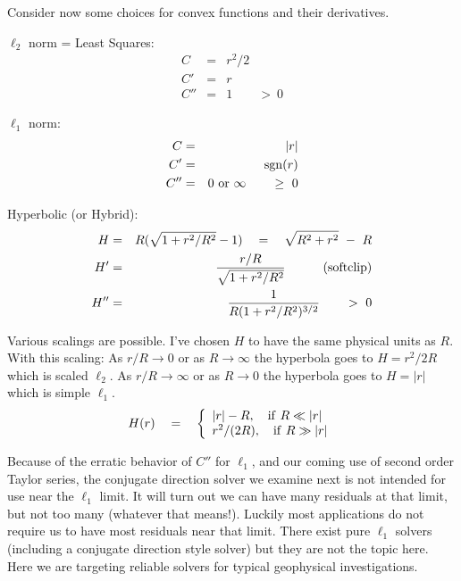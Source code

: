 Consider now some choices for convex functions
and their derivatives.
\noindent\par $\ell_2$ norm = Least Squares:
\begin{eqnarray}
C &=&  r^2/2
\\
C' &=&  r
\\
C'' &=& 1 \quad\quad > \ 0
\end{eqnarray}
\noindent\par $\ell_1$ norm:
\begin{eqnarray}
C &=&  |r|
\\
C' &=&  {\rm sgn}(r)
\\
C'' &=& 0 \ {\rm or}\ \infty \quad\quad \ge\ 0
\end{eqnarray}
\noindent\par Hyperbolic (or Hybrid):
\begin{eqnarray}
H &=& R (\sqrt{1 + r^2/R^2} - 1)
   \quad=\quad \sqrt{R^2 + r^2}\ -\ R
\label{eqn:hybrid}
\\
H' &=& 
\label{eqn:dhybrid}
 \frac{r/R}{\sqrt{1+r^2/R^2}}
 \quad\quad\quad {(\rm softclip)}
\\
H''
&=& 
\frac{1}{R(1+ r^2/R^2)^{3/2}}
		\quad\quad  > \ 0
\end{eqnarray}
\par
Various scalings are possible.
I've chosen $H$ to have the same physical units as $R$.
With this scaling:
As $r/R\rightarrow 0$      or as $R\rightarrow\infty$ the hyperbola goes to $H=r^2/2R$ which is scaled $\ell_2$.
As $r/R\rightarrow \infty$ or as $R\rightarrow     0$ the hyperbola goes to $H=|r|$ which is simple $\ell_1$.
\begin{equation}
H(r) \quad =\quad
\left\{
\begin{array}{l}
|r| - R,  \quad {\rm if} \ R \ll |r| 
\\
r^2/(2R), \quad {\rm if} \ R \gg |r|
\end{array}
\right.
\end{equation}
\par
Because of the erratic behavior of $C''$ for $\ell_1$,
and our coming use of second order Taylor series,
the conjugate direction solver
we examine next is not intended for use near the $\ell_1$ limit.
It will turn out we can have many residuals at that limit,
but not too many (whatever that means!).
Luckily most applications do not require us to have most residuals near that limit.
There exist pure $\ell_1$ solvers (including a conjugate direction style solver)
but they are not the topic here.
Here we are targeting reliable solvers for typical geophysical investigations.

